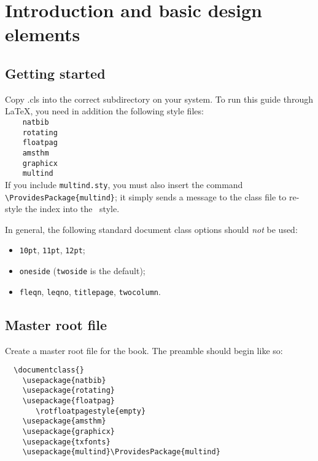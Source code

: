 
\chapter{Introduction and basic design elements}
\label{intro}

\section{Getting started}
\label{usingcamb}
Copy \cambridge.cls into the correct subdirectory on your system.
To run this guide through \LaTeX,
you need in addition the following style files:\\[0.5\baselineskip]
\verb"    natbib"\\
\verb"    rotating"\\
\verb"    floatpag"\\
\verb"    amsthm"\\
\verb"    graphicx"\\
\verb"    multind"\\[0.5\baselineskip]
If you include \verb"multind.sty", you must also insert the command
\verb"\ProvidesPackage{multind}"; it simply sends a message to the class file
to re-style the index into the \cambridge\ style.

In general, the following standard document class options should \emph{not} be used:
 \begin{itemize}
  \item \texttt{10pt}, \texttt{11pt}, \texttt{12pt};
  \item \texttt{oneside}  (\texttt{twoside} is the default);
  \item \texttt{fleqn}, \texttt{leqno}, \texttt{titlepage}, \texttt{twocolumn}.
 \end{itemize}


\section{Master root file}
Create a master root file for the book. The preamble should begin like so:

\verb"  \documentclass{"\texttt{\cambridge}\verb"}"\\
\verb"    \usepackage{natbib}"\\
\verb"    \usepackage{rotating}"\\
\verb"    \usepackage{floatpag}"\\
\verb"       \rotfloatpagestyle{empty}"\\
\verb"    \usepackage{amsthm}"\\
\verb"    \usepackage{graphicx}"\\
\verb"    \usepackage{txfonts}"\\
\verb"    \usepackage{multind}\ProvidesPackage{multind}"\\[0.5\baselineskip]

